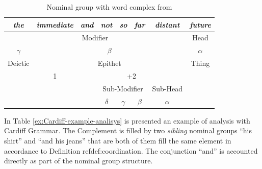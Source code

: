 \begin{table}[H]
    \centering
        \begin{tabular}{ccc|c|c|c|c|c}
            \hline
            \multicolumn{1}{|c|}{\textit{the}} & \multicolumn{1}{c|}{\textit{immediate}} & \textit{and}          & \textit{not} & \textit{so} & \textit{far} & \textit{distant}          & \multicolumn{1}{c|}{\textit{future}} \\ \hline
            \multicolumn{7}{|c|}{Modifier} & \multicolumn{1}{c|}{Head} \\ \hline
            \multicolumn{1}{|c|}{$\gamma$}            & \multicolumn{6}{c|}{$\beta$}                                                                                                                  & \multicolumn{1}{c|}{$\alpha$}               \\ \hline
            \multicolumn{1}{|c|}{Deictic}      & \multicolumn{6}{c|}{Epithet}                                                                                                            & \multicolumn{1}{c|}{Thing}           \\ \hline
            \multicolumn{1}{c|}{}              & \multicolumn{1}{c|}{1}                  & \multicolumn{5}{c|}{+2}                                                                       &                                      \\ \cline{2-7}
            \multicolumn{1}{l}{} & \multicolumn{1}{l}{} & \multicolumn{1}{l|}{} & \multicolumn{3}{c|}{Sub-Modifier} & Sub-Head & \multicolumn{1}{l}{} \\ \cline{4-7}
            &  &  & $\delta$ & $\gamma$ & $\beta$ & $\alpha$ &  \\ \cline{4-7}
        \end{tabular}%
    \caption{Nominal group with word complex from \citep[564]{Halliday2013}}
    \label{tab:sydney-coordination-ifg}
\end{table}


In Table \ref{ex:Cardiff-example-analisys} is presented an example of analysis with Cardiff Grammar. The Complement is filled by two \textit{sibling} nominal groups ``his shirt'' and ``and his jeans'' that are both of them fill the same element in accordance to Definition ref{def:coordination}. The conjunction ``and'' is accounted directly as part of the nominal group structure.

